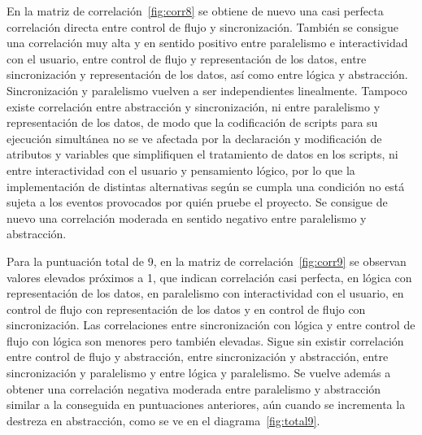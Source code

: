 \documentclass[a4paper, 12pt]{book}
\begin{document}
En la matriz de correlación~\ref{fig:corr8} se obtiene de nuevo una casi perfecta correlación directa entre control de flujo y sincronización. También se consigue una correlación muy alta y en sentido positivo entre paralelismo e interactividad con el usuario, entre control de flujo y representación de los datos, entre sincronización y representación de los datos, así como entre lógica y abstracción. Sincronización y paralelismo vuelven a ser independientes linealmente. Tampoco existe correlación entre abstracción y sincronización, ni entre paralelismo y representación de los datos, de modo que la codificación de scripts para su ejecución simultánea no se ve afectada por la declaración y modificación de atributos y variables que simplifiquen el tratamiento de datos en los scripts, ni entre  interactividad con el usuario y pensamiento lógico, por lo que la implementación de distintas alternativas según se cumpla una condición no está sujeta a los eventos provocados por quién pruebe el proyecto. Se consigue de nuevo una correlación moderada en sentido negativo entre paralelismo y abstracción.%

Para la puntuación total de 9, en la matriz de correlación~\ref{fig:corr9} se observan valores elevados próximos a 1, que indican correlación casi perfecta, en lógica con representación de los datos, en paralelismo con interactividad con el usuario, en control de flujo con representación de los datos y en control de flujo con sincronización. Las correlaciones entre sincronización con lógica y entre control de flujo con lógica son menores pero también elevadas. Sigue sin existir correlación entre control de flujo y abstracción, entre sincronización y abstracción, entre sincronización y paralelismo y entre lógica y paralelismo. Se vuelve además a obtener una correlación negativa moderada entre paralelismo y abstracción similar a la conseguida en puntuaciones anteriores, aún cuando se incrementa la destreza en abstracción, como se ve en el diagrama~\ref{fig:total9}.
\end{document}
